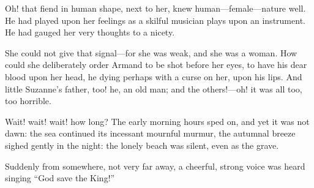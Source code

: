 Oh! that fiend in human shape, next to her, knew human---female---nature well. He had played upon her feelings as a skilful musician plays upon an instrument. He had gauged her very thoughts to a nicety.

She could not give that signal---for she was weak, and she was a woman. How could she deliberately order Armand to be shot before her eyes, to have his dear blood upon her head, he dying perhaps with a curse on her, upon his lips. And little Suzanne's father, too! he, an old man; and the others!---oh! it was all too, too horrible.

Wait! wait! wait! how long? The early morning hours sped on, and yet it was not dawn: the sea continued its incessant mournful murmur, the autumnal breeze sighed gently in the night: the lonely beach was silent, even as the grave.

Suddenly from somewhere, not very far away, a cheerful, strong voice was heard singing \enquote{God save the King!}
